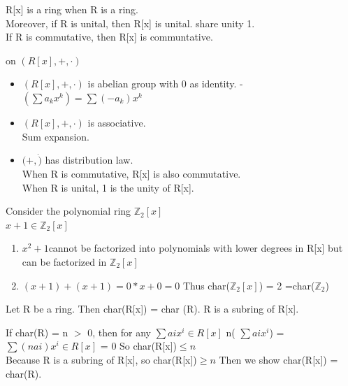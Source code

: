 \documentclass{article}
\newcommand\Z{\ensuremath{\mathbb{Z}}}
\begin{document}
\begin{theorem}
    R[x] is a ring when R is a ring.
    \\Moreover, if R is unital, then R[x] is unital. share unity 1. 
    \\If R is commutative, then R[x] is communtative. 
    
\end{theorem}
\begin{Proof} on $(R[x], +, \cdot)$
\begin{itemize}
    \item $(R[x], +, \cdot)$ is abelian group with 0 as identity.
    - $(\sum a_kx^k) = \sum (-a_k)x^k$
    \item $(R[x], +, \cdot)$ is associative.
   \\ Sum expansion. 

   \item $(+, \dot )$ has distribution law.
   \\ When R is commutative, R[x] is also commutative. 
   \\ When R is unital, 1 is the unity of R[x].
\end{itemize}
    
\end{Proof}


\begin{Example}
    Consider the polynomial ring $\Z_2 [x]$
    \\ $x+1 \in \Z_2[x]$
    \begin{enumerate}
    \item $x^2 + 1 $cannot be factorized into polynomials with lower degrees in R[x] but can be factorized in $\Z_2[x]$
    \item $(x+1) + (x+1)  = 0*x + 0 = 0$ Thus char($\Z_2 [x]$) = 2 =char($\Z_2$) 
    \end{enumerate}
\end{Example}

\begin{theorem}
    Let R be a ring. Then char(R[x]) = char (R). R is a subring of R[x].
\end{theorem}

\begin{Proof}
    If char(R) = n $>$ 0, then  for any $\sum aix^i \in R[x]$
    n( $\sum aix^i $) =  $\sum (nai)x^i \in R[x]$ = 0
    So char(R[x])$\leq n$
    \\ Because R is a subring of R[x], so char(R[x])$\geq n$ Then we show char(R[x]) = char(R).
    
\end{Proof}
\end{document}
